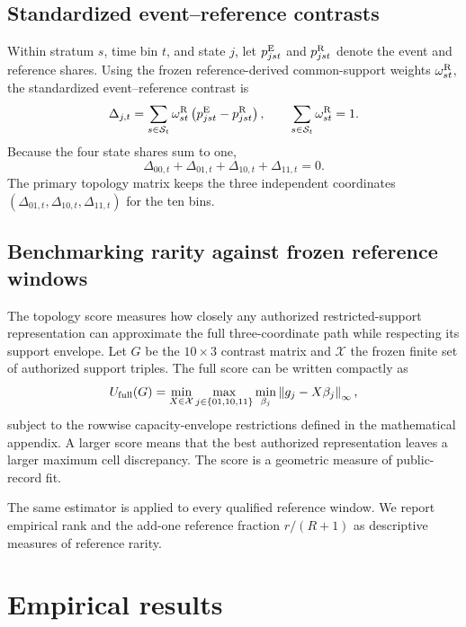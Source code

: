 \documentclass[11pt]{article}
\begin{document}
\subsection{Standardized event--reference contrasts}

Within stratum $s$, time bin $t$, and state $j$, let $p^{\mathrm{E}}_{jst}$ and $p^{\mathrm{R}}_{jst}$ denote the event and reference shares. Using the frozen reference-derived common-support weights $\omega^{\mathrm{R}}_{st}$, the standardized event--reference contrast is
\begin{equation}
\Delta_{j,t}=\sum_{s\in\mathcal S_t}\omega^{\mathrm{R}}_{st}
\left(p^{\mathrm{E}}_{jst}-p^{\mathrm{R}}_{jst}\right),
\qquad
\sum_{s\in\mathcal S_t}\omega^{\mathrm{R}}_{st}=1.
\label{eq:delta}
\end{equation}
Because the four state shares sum to one,
\begin{equation}
\Delta_{00,t}+\Delta_{01,t}+\Delta_{10,t}+\Delta_{11,t}=0.
\label{eq:simplex}
\end{equation}
The primary topology matrix keeps the three independent coordinates $(\Delta_{01,t},\Delta_{10,t},\Delta_{11,t})$ for the ten bins.

\subsection{Benchmarking rarity against frozen reference windows}

The topology score measures how closely any authorized restricted-support representation can approximate the full three-coordinate path while respecting its support envelope. Let $G$ be the $10\times3$ contrast matrix and $\mathcal X$ the frozen finite set of authorized support triples. The full score can be written compactly as
\begin{equation}
U_{\mathrm{full}}(G)=
\min_{X\in\mathcal X}\max_{j\in\{01,10,11\}}
\min_{\beta_j}\left\lVert g_j-X\beta_j\right\rVert_{\infty},
\label{eq:score_simple}
\end{equation}
subject to the rowwise capacity-envelope restrictions defined in the mathematical appendix. A larger score means that the best authorized representation leaves a larger maximum cell discrepancy. The score is a geometric measure of public-record fit.

The same estimator is applied to every qualified reference window. We report empirical rank and the add-one reference fraction $r/(R+1)$ as descriptive measures of reference rarity.

\section{Empirical results}
\end{document}
